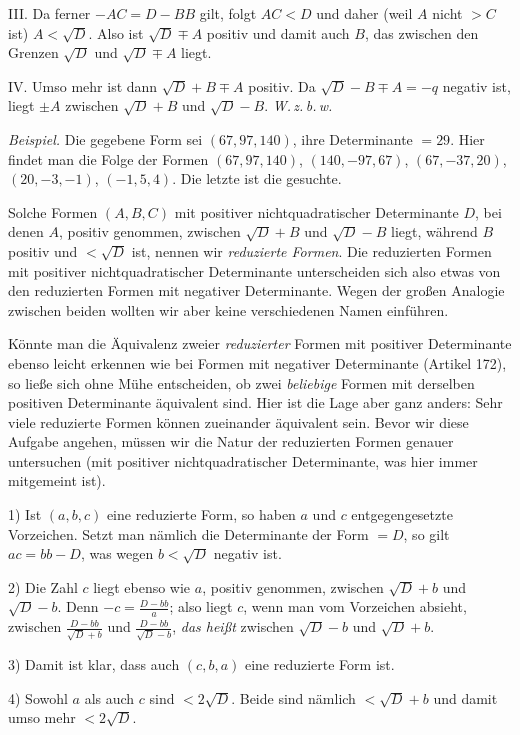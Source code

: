 III. Da ferner $-AC=D-BB$ gilt, folgt $AC<D$ und daher (weil $A$ nicht $>C$ ist) $A<\surd D$. Also ist $\surd D\mp A$ positiv und damit auch $B$, das zwischen den Grenzen $\surd D$ und $\surd D\mp A$ liegt.

IV. Umso mehr ist dann $\surd D+B\mp A$ positiv. Da $\surd D-B\mp A=-q$ negativ ist, liegt $\pm A$ zwischen $\surd D+B$ und $\surd D-B$. \textit{W.\,z.\,b.\,w.}

\textit{Beispiel.} Die gegebene Form sei $(67,97,140)$, ihre Determinante $=29$. Hier findet man die Folge der Formen $(67,97,140)$, $(140,-97,67)$, $(67,-37,20)$, $(20,-3,-1)$, $(-1,5,4)$. Die letzte ist die gesuchte.

Solche Formen $(A,B,C)$ mit positiver nichtquadratischer Determinante $D$, bei denen $A$, positiv genommen, zwischen $\surd D+B$ und $\surd D-B$ liegt, während $B$ positiv und $<\surd D$ ist, nennen wir \textit{reduzierte Formen}. Die reduzierten Formen mit positiver nichtquadratischer Determinante unterscheiden sich also etwas von den reduzierten Formen mit negativer Determinante. Wegen der großen Analogie zwischen beiden wollten wir aber keine verschiedenen Namen einführen.

Könnte man die Äquivalenz zweier \textit{reduzierter} Formen mit positiver Determinante ebenso leicht erkennen wie bei Formen mit negativer Determinante (Artikel 172), so ließe sich ohne Mühe entscheiden, ob zwei \textit{beliebige} Formen mit derselben positiven Determinante äquivalent sind. Hier ist die Lage aber ganz anders: Sehr viele reduzierte Formen können zueinander äquivalent sein. Bevor wir diese Aufgabe angehen, müssen wir die Natur der reduzierten Formen genauer untersuchen (mit positiver nichtquadratischer Determinante, was hier immer mitgemeint ist).

1) Ist $(a,b,c)$ eine reduzierte Form, so haben $a$ und $c$ entgegengesetzte Vorzeichen. Setzt man nämlich die Determinante der Form $=D$, so gilt $ac=bb-D$, was wegen $b<\surd D$ negativ ist.

2) Die Zahl $c$ liegt ebenso wie $a$, positiv genommen, zwischen $\surd D+b$ und $\surd D-b$. Denn $-c=\frac{D-bb}{a}$; also liegt $c$, wenn man vom Vorzeichen absieht, zwischen $\frac{D-bb}{\surd D+b}$ und $\frac{D-bb}{\surd D-b}$, \textit{das heißt} zwischen $\surd D-b$ und $\surd D+b$.

3) Damit ist klar, dass auch $(c,b,a)$ eine reduzierte Form ist.

4) Sowohl $a$ als auch $c$ sind $<2\surd D$. Beide sind nämlich $<\surd D+b$ und damit umso mehr $<2\surd D$.

